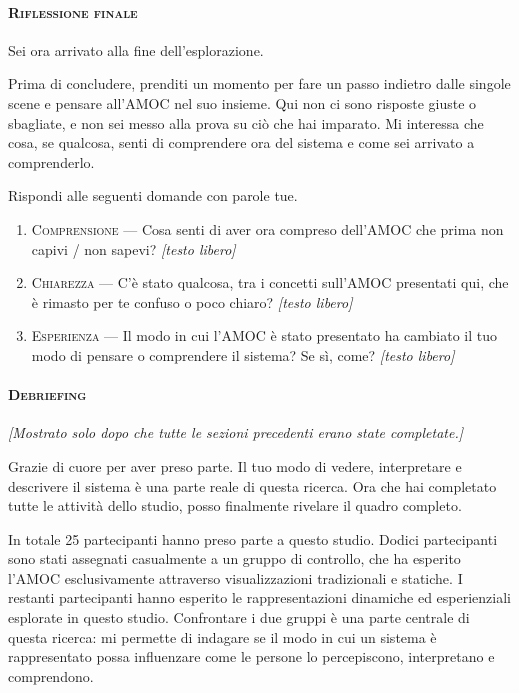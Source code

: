 \paragraph{\textsc{Riflessione finale}}
Sei ora arrivato alla fine dell'esplorazione.

Prima di concludere, prenditi un momento per fare un passo indietro dalle singole scene e pensare
all'AMOC nel suo insieme. Qui non ci sono risposte giuste o sbagliate, e non sei messo alla prova su
ciò che hai imparato. Mi interessa che cosa, se qualcosa, senti di comprendere ora del sistema e come
sei arrivato a comprenderlo.

Rispondi alle seguenti domande con parole tue.

\begin{enumerate}[leftmargin=2.4em, itemsep=3pt, start=19]
\item \textsc{Comprensione} --- Cosa senti di aver ora compreso dell'AMOC che prima non capivi / non
      sapevi? \emph{[testo libero]}
\item \textsc{Chiarezza} --- C'è stato qualcosa, tra i concetti sull'AMOC presentati qui, che è
      rimasto per te confuso o poco chiaro? \emph{[testo libero]}
\item \textsc{Esperienza} --- Il modo in cui l'AMOC è stato presentato ha cambiato il tuo modo di
      pensare o comprendere il sistema? Se sì, come? \emph{[testo libero]}
\end{enumerate}

\paragraph{\textsc{Debriefing}}
\emph{[Mostrato solo dopo che tutte le sezioni precedenti erano state completate.]}

Grazie di cuore per aver preso parte. Il tuo modo di vedere, interpretare e descrivere il sistema è
una parte reale di questa ricerca. Ora che hai completato tutte le attività dello studio, posso
finalmente rivelare il quadro completo.

In totale 25 partecipanti hanno preso parte a questo studio. Dodici partecipanti sono stati
assegnati casualmente a un gruppo di controllo, che ha esperito l'AMOC esclusivamente attraverso
visualizzazioni tradizionali e statiche. I restanti partecipanti hanno esperito le rappresentazioni
dinamiche ed esperienziali esplorate in questo studio. Confrontare i due gruppi è una parte centrale
di questa ricerca: mi permette di indagare se il modo in cui un sistema è rappresentato possa
influenzare come le persone lo percepiscono, interpretano e comprendono.

